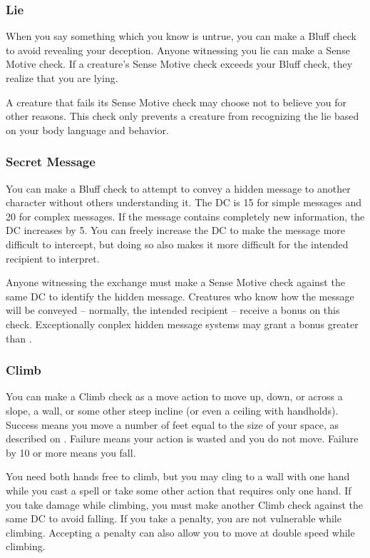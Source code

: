 \subsubsection{Lie}
When you say something which you know is untrue, you can make a Bluff check to avoid revealing your deception. Anyone witnessing you lie can make a Sense Motive check. If a creature's Sense Motive check exceeds your Bluff check, they realize that you are lying.

A creature that fails its Sense Motive check may choose not to believe you for other reasons. This check only prevents a creature from recognizing the lie based on your body language and behavior.

\subsubsection{Secret Message}
You can make a Bluff check to attempt to convey a hidden message to another character without others understanding it. The DC is 15 for simple messages and 20 for complex messages. If the message contains completely new information, the DC increases by 5. You can freely increase the DC to make the message more difficult to intercept, but doing so also makes it more difficult for the intended recipient to interpret.

Anyone witnessing the exchange must make a Sense Motive check against the same DC to identify the hidden message. Creatures who know how the message will be conveyed -- normally, the intended recipient -- receive a  bonus on this check. Exceptionally conplex hidden message systems may grant a bonus greater than .


\subsubsection{Climb}
You can make a Climb check as a move action to move up, down, or across a slope, a wall, or some other steep incline (or even a ceiling with handholds). Success means you move a number of feet equal to the size of your space, as described on . Failure means your action is wasted and you do not move. Failure by 10 or more means you fall.

You need both hands free to climb, but you may cling to a wall with one hand while you cast a spell or take some other action that requires only one hand. If you take damage while climbing, you must make another Climb check against the same DC to avoid falling. If you take a  penalty, you are not vulnerable while climbing. Accepting a  penalty can also allow you to move at double speed while climbing. 

